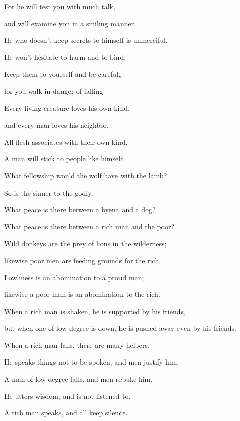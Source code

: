 {\par }{\Q For he will test you with much talk,
\par }{\QB and will examine you in a smiling manner.
\par }{\Q {}He who doesn’t keep secrets to himself is unmerciful.
\par }{\QB He won’t hesitate to harm and to bind.
\par }{\Q {}Keep them to yourself and be careful,
\par }{\QB for you walk
 in danger of falling.
\par }{\Q {}Every living creature loves his own kind,
\par }{\QB and every man loves his neighbor.
\par }{\Q {}All flesh associates with their own kind.
\par }{\QB A man will stick to people like himself.
\par }{\Q {}What fellowship would the wolf have with the lamb?
\par }{\QB So is the sinner to the godly.
\par }{\Q {}What peace is there between a hyena and a dog?
\par }{\QB What peace is there between a rich man and the poor?
\par }{\Q {}Wild donkeys are the prey of lions in the wilderness;
\par }{\QB likewise poor men are feeding grounds for the rich.
\par }{\Q {}Lowliness is an abomination to a proud man;
\par }{\QB likewise a poor man is an abomination to the rich.
\par }{\BB \par }{\Q {}When a rich man is shaken, he is supported by his friends,
\par }{\QB but when one of low degree is down, he is pushed away even by his friends.
\par }{\Q {}When a rich man falls, there are many helpers.
\par }{\QB He speaks things not to be spoken, and men justify him.
\par }{\Q A man of low degree falls, and men rebuke him.
\par }{\QB He utters wisdom, and is not listened to.
\par }{\Q {}A rich man speaks, and all keep silence.
}
